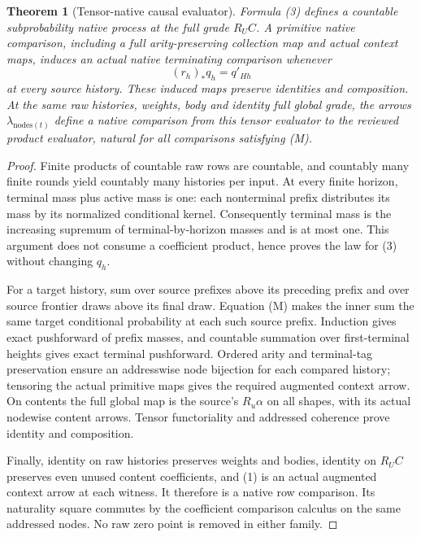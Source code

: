 \documentclass[11pt]{article}
\newtheorem{theorem}{Theorem}\newtheorem{proposition}[theorem]{Proposition}
\begin{document}
\begin{theorem}[Tensor-native causal evaluator]
Formula (3) defines a countable subprobability native process at the full grade $R_UC$. A primitive native comparison, including a full arity-preserving collection map and actual context maps, induces an actual native terminating comparison whenever
\[
 (r_h)_*q_h=q'_{Hh}                                         \tag{M}
\]
at every source history. These induced maps preserve identities and composition. At the same raw histories, weights, body and identity full global grade, the arrows $\lambda_{\mathrm{nodes}(t)}$ define a native comparison from this tensor evaluator to the reviewed product evaluator, natural for all comparisons satisfying (M).
\end{theorem}
\begin{proof}
Finite products of countable raw rows are countable, and countably many finite rounds yield countably many histories per input. At every finite horizon, terminal mass plus active mass is one: each nonterminal prefix distributes its mass by its normalized conditional kernel. Consequently terminal mass is the increasing supremum of terminal-by-horizon masses and is at most one. This argument does not consume a coefficient product, hence proves the law for (3) without changing $q_h$.

For a target history, sum over source prefixes above its preceding prefix and over source frontier draws above its final draw. Equation (M) makes the inner sum the same target conditional probability at each such source prefix. Induction gives exact pushforward of prefix masses, and countable summation over first-terminal heights gives exact terminal pushforward. Ordered arity and terminal-tag preservation ensure an addresswise node bijection for each compared history; tensoring the actual primitive maps gives the required augmented context arrow. On contents the full global map is the source's $R_u\alpha$ on all shapes, with its actual nodewise content arrows. Tensor functoriality and addressed coherence prove identity and composition.

Finally, identity on raw histories preserves weights and bodies, identity on $R_UC$ preserves even unused content coefficients, and (1) is an actual augmented context arrow at each witness. It therefore is a native row comparison. Its naturality square commutes by the coefficient comparison calculus on the same addressed nodes. No raw zero point is removed in either family.
\end{proof}
\end{document}
